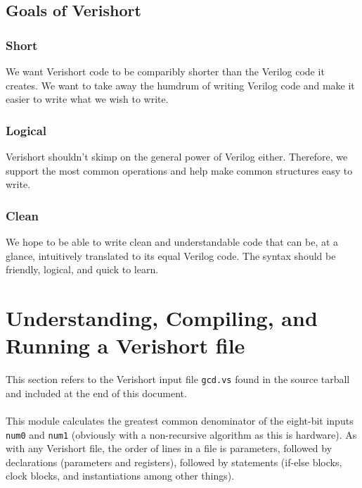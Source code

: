 \documentclass[letterpaper,11pt]{article}
\begin{document}
        \subsection{Goals of Verishort}
        \subsubsection{Short}
        We want Verishort code to be comparibly shorter than the Verilog code it creates. We want to
        take away the humdrum of writing Verilog code and make it easier to write what we wish to write. 
        \subsubsection{Logical}
        Verishort shouldn't skimp on the general power of Verilog either. Therefore, we support the most
        common operations and help make common structures easy to write. 
        \subsubsection{Clean}
        We hope to be able to write clean and understandable code that can be, at a glance, intuitively 
        translated to its equal Verilog code. The syntax should be friendly, logical, and quick to learn.



\section{Understanding, Compiling, and Running a Verishort file}
This section refers to the Verishort input file \texttt{gcd.vs} found in the source tarball and included at the end of this document.\\\\
This module calculates the greatest common denominator of the eight-bit inputs \texttt{num0} and \texttt{num1} (obviously with a non-recursive algorithm as this is hardware).  As with any Verishort file, the order of lines in a file is parameters, followed by declarations (parameters and registers), followed by statements (if-else blocks, clock blocks, and instantiations among other things).\\\\
\end{document}
